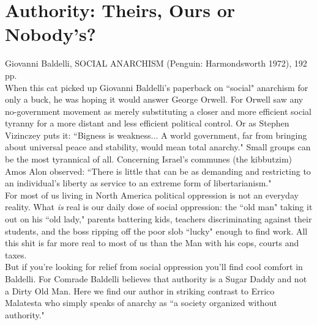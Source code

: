 \chapter{Authority: Theirs, Ours or Nobody's?}

\noindent Giovanni Baldelli, SOCIAL ANARCHISM (Penguin: Harmondsworth 1972), 192 pp.\\

\indent When this cat picked up Giovanni Baldelli's paperback on ``social" anarchism for only a buck, he was hoping it would answer George Orwell. For Orwell saw any no-government movement as merely substituting a closer and more efficient social tyranny for a more distant and less efficient political control. Or as Stephen Vizinczey puts it: ``Bigness is weakness... A world government, far from bringing about universal peace and stability, would mean total anarchy." Small groups can be the most tyrannical of all. Concerning Israel's communes (the kibbutzim) Amos Alon observed: ``There is little that can be as demanding and restricting to an individual's liberty as service to an extreme form of libertarianism."\\
For most of us living in North America political oppression is not an everyday reality. What \emph{is} real is our daily dose of social oppression: the ``old man" taking it out on his ``old lady," parents battering kids, teachers discriminating against their students, and the boss ripping off the poor slob ``lucky" enough to find work. All this shit is far more real to most of us than the Man with his cops, courts and taxes.\\
But if you're looking for relief from social oppression you'll find cool comfort in Baldelli. For Comrade Baldelli believes that authority is a Sugar Daddy and not a Dirty Old Man. Here we find our author in striking contrast to Errico Malatesta who simply speaks of anarchy as ``a society organized without authority."\\

